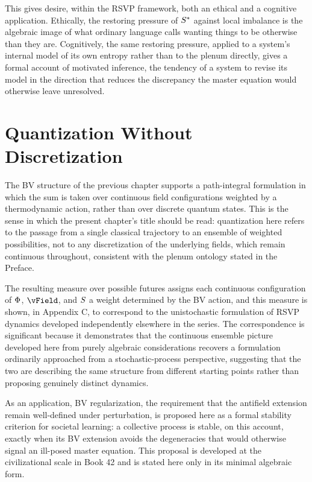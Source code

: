 This gives desire, within the RSVP framework, both an ethical and a cognitive application. Ethically, the restoring pressure of $S^{*}$ against local imbalance is the algebraic image of what ordinary language calls wanting things to be otherwise than they are. Cognitively, the same restoring pressure, applied to a system's internal model of its own entropy rather than to the plenum directly, gives a formal account of motivated inference, the tendency of a system to revise its model in the direction that reduces the discrepancy the master equation would otherwise leave unresolved.

\chapter{Quantization Without Discretization}

The BV structure of the previous chapter supports a path-integral formulation in which the sum is taken over continuous field configurations weighted by a thermodynamic action, rather than over discrete quantum states. This is the sense in which the present chapter's title should be read: quantization here refers to the passage from a single classical trajectory to an ensemble of weighted possibilities, not to any discretization of the underlying fields, which remain continuous throughout, consistent with the plenum ontology stated in the Preface.

The resulting measure over possible futures assigns each continuous configuration of $\Phi$, $\vField$, and $S$ a weight determined by the BV action, and this measure is shown, in Appendix C, to correspond to the unistochastic formulation of RSVP dynamics developed independently elsewhere in the series. The correspondence is significant because it demonstrates that the continuous ensemble picture developed here from purely algebraic considerations recovers a formulation ordinarily approached from a stochastic-process perspective, suggesting that the two are describing the same structure from different starting points rather than proposing genuinely distinct dynamics.

As an application, BV regularization, the requirement that the antifield extension remain well-defined under perturbation, is proposed here as a formal stability criterion for societal learning: a collective process is stable, on this account, exactly when its BV extension avoids the degeneracies that would otherwise signal an ill-posed master equation. This proposal is developed at the civilizational scale in Book 42 and is stated here only in its minimal algebraic form.

